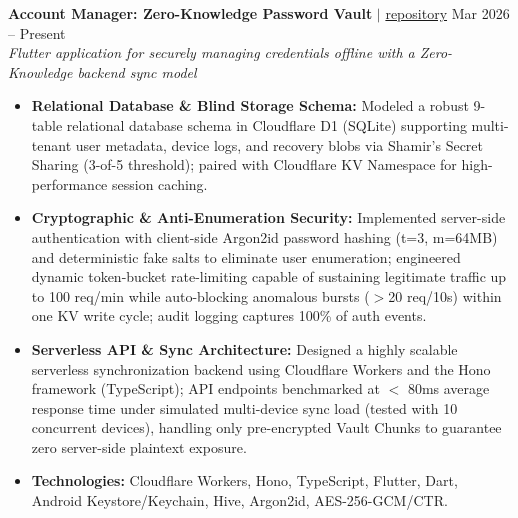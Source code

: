\documentclass[10pt,a4paper]{article}
\begin{document}
\noindent \textbf{Account Manager: Zero-Knowledge Password Vault} $|$ \href{https://github.com/Chickyo/Account-Manager}{repository} \hfill Mar 2026 -- Present\\
\textit{Flutter application for securely managing credentials offline with a Zero-Knowledge backend sync model}
\begin{itemize}[leftmargin=0.25in, nosep]
    \item \textbf{Relational Database \& Blind Storage Schema:} Modeled a robust 9-table relational database schema in Cloudflare D1 (SQLite) supporting multi-tenant user metadata, device logs, and recovery blobs via Shamir's Secret Sharing (3-of-5 threshold); paired with Cloudflare KV Namespace for high-performance session caching.
    \item \textbf{Cryptographic \& Anti-Enumeration Security:} Implemented server-side authentication with client-side Argon2id password hashing (t=3, m=64MB) and deterministic fake salts to eliminate user enumeration; engineered dynamic token-bucket rate-limiting capable of sustaining legitimate traffic up to 100 req/min while auto-blocking anomalous bursts ($>$20 req/10s) within one KV write cycle; audit logging captures 100\% of auth events.
    \item \textbf{Serverless API \& Sync Architecture:} Designed a highly scalable serverless synchronization backend using Cloudflare Workers and the Hono framework (TypeScript); API endpoints benchmarked at $<$ 80ms average response time under simulated multi-device sync load (tested with 10 concurrent devices), handling only pre-encrypted Vault Chunks to guarantee zero server-side plaintext exposure.
    \item \textbf{Technologies:} Cloudflare Workers, Hono, TypeScript, Flutter, Dart, Android Keystore/Keychain, Hive, Argon2id, AES-256-GCM/CTR.
\end{itemize}
\vspace{10pt}
\end{document}
